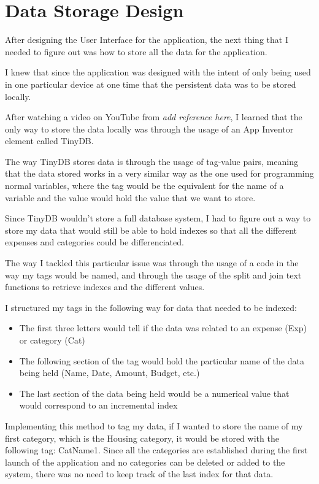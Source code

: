 \chapter{Data Storage Design}
After designing the User Interface for the application, the next thing that I needed to figure out was how to store all the data for the application.

I knew that since the application was designed with the intent of only being used in one particular device at one time that the persistent data was to be stored locally.

After watching a video on YouTube from \emph{add reference here}, I learned that the only way to store the data locally was through the usage of an App Inventor element called TinyDB.

The way TinyDB stores data is through the usage of tag-value pairs, meaning that the data stored works in a very similar way as the one used for programming normal variables, where the tag would be the equivalent for the name of a variable and the value would hold the value that we want to store.

Since TinyDB wouldn't store a full database system, I had to figure out a way to store my data that would still be able to hold indexes so that all the different expenses and categories could be differenciated.

The way I tackled this particular issue was through the usage of a code in the way my tags would be named, and through the usage of the split and join text functions to retrieve indexes and the different values.

I structured my tags in the following way for data that needed to be indexed:
\begin{itemize}
  \item The first three letters would tell if the data was related to an expense (Exp) or category (Cat)
  \item The following section of the tag would hold the particular name of the data being held (Name, Date, Amount, Budget, etc.)
  \item The last section of the data being held would be a numerical value that would correspond to an incremental index
\end{itemize}

Implementing this method to tag my data, if I wanted to store the name of my first category, which is the Housing category, it would be stored with the following tag: CatName1. Since all the categories are established during the first launch of the application and no categories can be deleted or added to the system, there was no need to keep track of the last index for that data.

